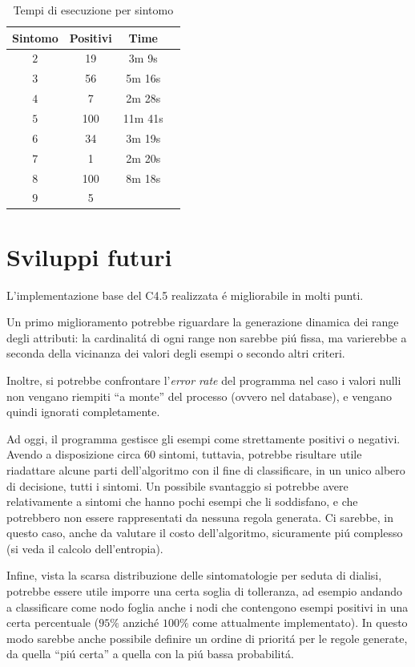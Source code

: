 \documentclass[preprint]{acm_proc_article-sp}
\begin{document}
\begin{table}[h]
\centering
\begin{tabular}{|c|c|c|c|} \hline
\textbf{Sintomo} & \textbf{Positivi} & \textbf{Time} \\ \hline \hline
$2$ & 19 & 3m 9s \\ \hline
$3$ & 56 & 5m 16s \\ \hline
$4$ & 7 & 2m 28s \\ \hline
$5$ & 100 & 11m 41s \\ \hline
$6$ & 34 & 3m 19s \\ \hline
$7$ & 1 & 2m 20s \\ \hline
$8$ & 100 & 8m 18s \\ \hline
$9$ & 5 &  \\
\hline\end{tabular}
\caption{Tempi di esecuzione per sintomo}
\label{table:risultati-tempi}
\end{table}

\section{Sviluppi futuri}
\label{sviluppi-futuri}
L'implementazione base del C4.5 realizzata \'e migliorabile in molti punti.

Un primo miglioramento potrebbe riguardare la generazione dinamica dei range degli attributi: la cardinalit\'a di ogni range non sarebbe pi\'u fissa, ma varierebbe a seconda della vicinanza dei valori degli esempi o secondo altri criteri.

Inoltre, si potrebbe confrontare l'\textit{error rate} del programma nel caso i valori nulli non vengano riempiti ``a monte'' del processo (ovvero nel database), e vengano quindi ignorati completamente.

Ad oggi, il programma gestisce gli esempi come strettamente positivi o negativi. Avendo a disposizione circa $60$ sintomi, tuttavia, potrebbe risultare utile riadattare alcune parti dell'algoritmo con il fine di classificare, in un unico albero di decisione, tutti i sintomi. Un possibile svantaggio si potrebbe avere relativamente a sintomi che hanno pochi esempi che li soddisfano, e che potrebbero non essere rappresentati da nessuna regola generata. Ci sarebbe, in questo caso, anche da valutare il costo dell'algoritmo, sicuramente pi\'u complesso (si veda il calcolo dell'entropia).

Infine, vista la scarsa distribuzione delle sintomatologie per seduta di dialisi, potrebbe essere utile imporre una certa soglia di tolleranza, ad esempio andando a classificare come nodo foglia anche i nodi che contengono esempi positivi in una certa percentuale ($95\%$ anzich\'e $100\%$ come attualmente implementato). In questo modo sarebbe anche possibile definire un ordine di priorit\'a per le regole generate, da quella ``pi\'u certa'' a quella con la pi\'u bassa probabilit\'a.
\end{document}
